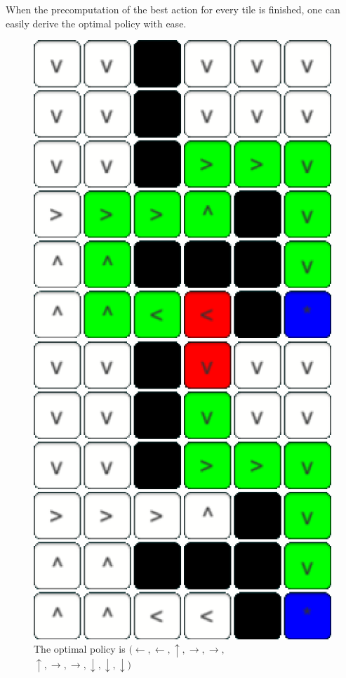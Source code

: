 \documentclass[conference]{IEEEtran}
\begin{document}
When the precomputation of the best action for every tile is finished, one can easily derive the optimal policy with ease.

\begin{figure}[h]
\centering
\begin{minipage}[t]{0.3\linewidth}
\centering
\includegraphics[width=1\textwidth]{images/Policies/01.png}
\caption{The optimal policy is $(\leftarrow,\leftarrow,\uparrow,\rightarrow,\rightarrow,$\\$\uparrow,\rightarrow,\rightarrow,\downarrow,\downarrow,\downarrow)$}
\end{minipage}
\hfill
\begin{minipage}[t]{0.3\linewidth}
\centering
\includegraphics[width=1\textwidth]{images/Policies/02.png}

\end{minipage}
\end{figure}
\end{document}

